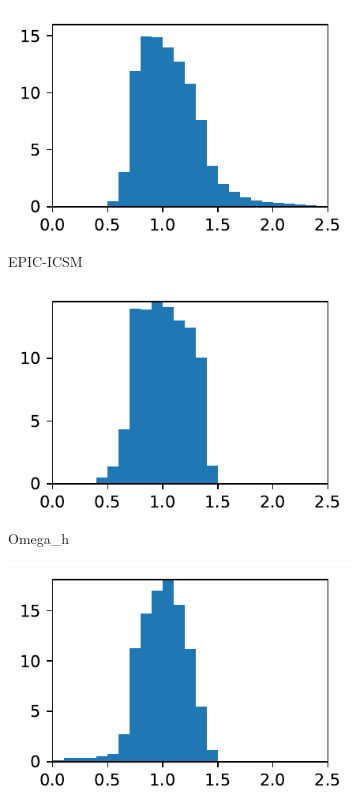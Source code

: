 \documentclass[3p,times,procedia,number]{elsarticle}
\begin{document}
\begin{figure}
\begin{subfigure}{.16\textwidth}
\centering
\includegraphics[width=\textwidth]{epic-icsm-cube-cylinder-linear-length.pdf}
\caption{EPIC-ICSM}
\end{subfigure}
\begin{subfigure}{.16\textwidth}
\centering
\includegraphics[width=\textwidth]{omega_h-cube-cylinder-linear-length.pdf}
\caption{Omega\_h}
\end{subfigure}
\begin{subfigure}{.16\textwidth}
\centering
\includegraphics[width=\textwidth]{pragmatic-cube-cylinder-linear-length.pdf}

\end{subfigure}
\end{figure}
\end{document}
